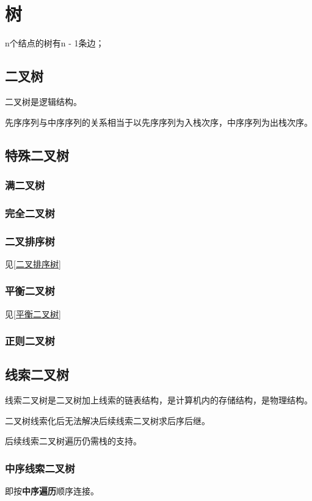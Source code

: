 
\chapter{树}
n个结点的树有n - 1条边；


\section{二叉树}

二叉树是逻辑结构。

先序序列与中序序列的关系相当于以先序序列为入栈次序，中序序列为出栈次序。


\section{特殊二叉树}

\subsection{满二叉树}


\subsection{完全二叉树}


\subsection{二叉排序树}
见\ref{二叉排序树}

\subsection{平衡二叉树}
见\ref{平衡二叉树}

\subsection{正则二叉树}


\section{线索二叉树}

线索二叉树是二叉树加上线索的链表结构，是计算机内的存储结构，是物理结构。

二叉树线索化后无法解决后续线索二叉树求后序后继。

后续线索二叉树遍历仍需栈的支持。

\subsection{中序线索二叉树}
即按\textbf{中序遍历}顺序连接。

